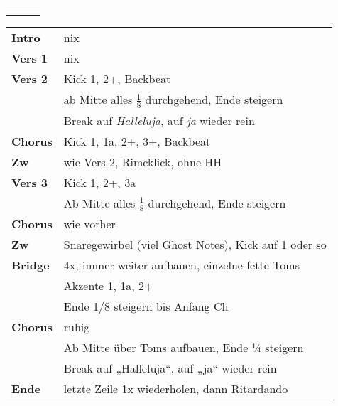 

\begin{tabular}{p{0.6cm}p{12cm}p{1.4cm}}
	\rowcolor{cyan} \myRow{\thesongnumber} & \myRow{Golgatha} & \myRow{79} \\
	                                       &                  &            \\
\end{tabular}

\begin{tabular}{p{1.6cm}l}
	\textbf{Intro}  & nix                                                       \\
	\textbf{Vers 1} & nix                                                       \\
	\textbf{Vers 2} & Kick 1, 2+, Backbeat                                      \\
	                & ab Mitte alles $\frac{1}{8}$ durchgehend, Ende steigern   \\
	                & Break auf \textit{Halleluja}, auf \textit{ja} wieder rein \\
	\textbf{Chorus} & Kick 1, 1a, 2+, 3+, Backbeat                              \\
	\textbf{Zw}     & wie Vers 2, Rimcklick, ohne HH                            \\
	\textbf{Vers 3} & Kick 1, 2+, 3a                                            \\
	                & Ab Mitte alles $\frac{1}{8}$ durchgehend, Ende steigern   \\
	\textbf{Chorus} & wie vorher                                                \\
	\textbf{Zw}     & Snaregewirbel (viel Ghost Notes), Kick auf 1 oder so      \\
	\textbf{Bridge} & 4x, immer weiter aufbauen, einzelne fette Toms            \\
	                & Akzente 1, 1a, 2+                                         \\
	                & Ende 1/8 steigern bis Anfang Ch                           \\
	\textbf{Chorus} & ruhig                                                     \\
	                & Ab Mitte über Toms aufbauen, Ende ¼ steigern              \\
	                & Break auf „Halleluja“, auf „ja“ wieder rein               \\
	\textbf{Ende}   & letzte Zeile 1x wiederholen, dann Ritardando              \\
\end{tabular}
